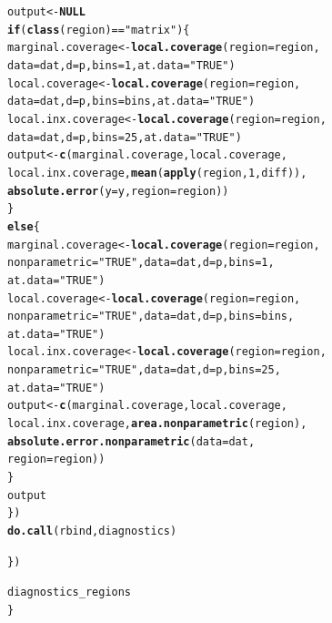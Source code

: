 \documentclass[11pt]{article}\usepackage[]{graphicx}\usepackage[]{color}
\makeatletter
\newcommand{\hlnum}[1]{\textcolor[rgb]{0.686,0.059,0.569}{#1}}%
\newcommand{\hlstr}[1]{\textcolor[rgb]{0.192,0.494,0.8}{#1}}%
\newcommand{\hlopt}[1]{\textcolor[rgb]{0,0,0}{#1}}%
\newcommand{\hlstd}[1]{\textcolor[rgb]{0.345,0.345,0.345}{#1}}%
\newcommand{\hlkwa}[1]{\textcolor[rgb]{0.161,0.373,0.58}{\textbf{#1}}}%
\newcommand{\hlkwb}[1]{\textcolor[rgb]{0.69,0.353,0.396}{#1}}%
\newcommand{\hlkwc}[1]{\textcolor[rgb]{0.333,0.667,0.333}{#1}}%
\newcommand{\hlkwd}[1]{\textcolor[rgb]{0.737,0.353,0.396}{\textbf{#1}}}%
\newenvironment{kframe}{%
 \def\at@end@of@kframe{}%
 \ifinner\ifhmode%
  \def\at@end@of@kframe{\end{minipage}}%
  \begin{minipage}{\columnwidth}%
 \fi\fi%
 \def\FrameCommand##1{\hskip\@totalleftmargin \hskip-\fboxsep
 \colorbox{shadecolor}{##1}\hskip-\fboxsep
     \hskip-\linewidth \hskip-\@totalleftmargin \hskip\columnwidth}%
 \MakeFramed {\advance\hsize-\width
   \@totalleftmargin\z@ \linewidth\hsize
   \@setminipage}}%
 {\par\unskip\endMakeFramed%
 \at@end@of@kframe}
\newenvironment{knitrout}{}{} %
\makeatother
\begin{document}
\begin{knitrout}
\begin{kframe}
\begin{alltt}
      \hlstd{output} \hlkwb{<-} \hlkwa{NULL}
      \hlkwa{if}\hlstd{(}\hlkwd{class}\hlstd{(region)} \hlopt{==} \hlstr{"matrix"}\hlstd{)\{}
        \hlstd{marginal.coverage} \hlkwb{<-} \hlkwd{local.coverage}\hlstd{(}\hlkwc{region} \hlstd{= region,}
          \hlkwc{data} \hlstd{= dat,} \hlkwc{d} \hlstd{= p,} \hlkwc{bins} \hlstd{=} \hlnum{1}\hlstd{,} \hlkwc{at.data} \hlstd{=} \hlstr{"TRUE"}\hlstd{)}
        \hlstd{local.coverage} \hlkwb{<-} \hlkwd{local.coverage}\hlstd{(}\hlkwc{region} \hlstd{= region,}
          \hlkwc{data} \hlstd{= dat,} \hlkwc{d} \hlstd{= p,} \hlkwc{bins} \hlstd{= bins,} \hlkwc{at.data} \hlstd{=} \hlstr{"TRUE"}\hlstd{)}
        \hlstd{local.inx.coverage} \hlkwb{<-} \hlkwd{local.coverage}\hlstd{(}\hlkwc{region} \hlstd{= region,}
          \hlkwc{data} \hlstd{= dat,} \hlkwc{d} \hlstd{= p,} \hlkwc{bins} \hlstd{=} \hlnum{25}\hlstd{,} \hlkwc{at.data} \hlstd{=} \hlstr{"TRUE"}\hlstd{)}
        \hlstd{output} \hlkwb{<-} \hlkwd{c}\hlstd{(marginal.coverage, local.coverage,}
          \hlstd{local.inx.coverage,} \hlkwd{mean}\hlstd{(}\hlkwd{apply}\hlstd{(region,} \hlnum{1}\hlstd{, diff)),}
          \hlkwd{absolute.error}\hlstd{(}\hlkwc{y} \hlstd{= y,} \hlkwc{region} \hlstd{= region))}
      \hlstd{\}}
      \hlkwa{else}\hlstd{\{}
        \hlstd{marginal.coverage} \hlkwb{<-} \hlkwd{local.coverage}\hlstd{(}\hlkwc{region} \hlstd{= region,}
          \hlkwc{nonparametric} \hlstd{=} \hlstr{"TRUE"}\hlstd{,} \hlkwc{data} \hlstd{= dat,} \hlkwc{d} \hlstd{= p,} \hlkwc{bins} \hlstd{=} \hlnum{1}\hlstd{,}
          \hlkwc{at.data} \hlstd{=} \hlstr{"TRUE"}\hlstd{)}
        \hlstd{local.coverage} \hlkwb{<-} \hlkwd{local.coverage}\hlstd{(}\hlkwc{region} \hlstd{= region,}
          \hlkwc{nonparametric} \hlstd{=} \hlstr{"TRUE"}\hlstd{,} \hlkwc{data} \hlstd{= dat,} \hlkwc{d} \hlstd{= p,} \hlkwc{bins} \hlstd{= bins,}
          \hlkwc{at.data} \hlstd{=} \hlstr{"TRUE"}\hlstd{)}
        \hlstd{local.inx.coverage} \hlkwb{<-} \hlkwd{local.coverage}\hlstd{(}\hlkwc{region} \hlstd{= region,}
          \hlkwc{nonparametric} \hlstd{=} \hlstr{"TRUE"}\hlstd{,} \hlkwc{data} \hlstd{= dat,} \hlkwc{d} \hlstd{= p,} \hlkwc{bins} \hlstd{=} \hlnum{25}\hlstd{,}
          \hlkwc{at.data} \hlstd{=} \hlstr{"TRUE"}\hlstd{)}
        \hlstd{output} \hlkwb{<-} \hlkwd{c}\hlstd{(marginal.coverage, local.coverage,}
          \hlstd{local.inx.coverage,} \hlkwd{area.nonparametric}\hlstd{(region),}
          \hlkwd{absolute.error.nonparametric}\hlstd{(}\hlkwc{data} \hlstd{= dat,}
            \hlkwc{region} \hlstd{= region))}
      \hlstd{\}}
      \hlstd{output}
    \hlstd{\})}
    \hlkwd{do.call}\hlstd{(rbind, diagnostics)}

  \hlstd{\})}

  \hlstd{diagnostics_regions}
\hlstd{\}}
\end{alltt}
\end{kframe}
\end{knitrout}
\end{document}
